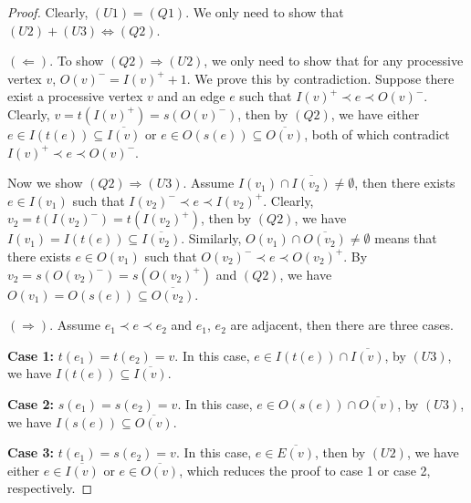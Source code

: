 \documentclass[10pt,a4paper]{amsart}
\begin{document}
\begin{proof}
Clearly, $(U1)=(Q1)$. We only need to show that $(U2)+(U3)\Longleftrightarrow (Q2)$.

$(\Longleftarrow)$. To show $(Q2)\Longrightarrow(U2)$, we only need to show that for any processive vertex $v$, $O(v)^-=I(v)^++1$. We prove this by contradiction. Suppose there exist a processive vertex $v$ and an edge $e$ such that $I(v)^+\prec e \prec O(v)^-$. Clearly, $v=t(I(v)^+)=s(O(v)^-)$, then by $(Q2)$, we have either $e\in I(t(e))\subseteq \overline{I(v)}$ or $e\in O(s(e))\subseteq\overline{O(v)}$, both of which  contradict $I(v)^+\prec e \prec O(v)^-$.

Now we show $(Q2)\Longrightarrow(U3)$. Assume $I(v_1)\cap \overline{I(v_2)}\neq \emptyset$, then there exists $e\in I(v_1)$ such that $I(v_2)^-\prec e \prec I(v_2)^+$. Clearly, $v_2=t(I(v_2)^-)=t(I(v_2)^+)$, then by $(Q2)$, we have $I(v_1)=I(t(e))\subseteq \overline{I(v_2)}$. Similarly, $O(v_1)\cap \overline{O(v_2)}\neq \emptyset$ means that there exists $e\in O(v_1)$ such that $O(v_2)^-\prec e \prec O(v_2)^+$. By $v_2=s(O(v_2)^-)=s(O(v_2)^+)$ and $(Q2)$, we have $O(v_1)=O(s(e))\subseteq \overline{O(v_2)}$.

$(\Longrightarrow)$. Assume $e_1\prec e\prec e_2$ and $e_1$, $e_2$ are adjacent, then there are three cases.

\noindent\textbf{Case 1:} $t(e_1)=t(e_2)=v$. In this case, $e\in I(t(e))\cap\overline{I(v)}$, by $(U3)$, we have $I(t(e))\subseteq\overline{I(v)}$.

\noindent\textbf{Case 2:} $s(e_1)=s(e_2)=v$. In this case, $e\in O(s(e))\cap\overline{O(v)}$, by $(U3)$, we have $I(s(e))\subseteq\overline{O(v)}$.

\noindent\textbf{Case 3:} $t(e_1)=s(e_2)=v$. In this case, $e\in \overline{E(v)}$, then by $(U2)$, we have either $e\in \overline{I(v)}$ or $e\in \overline{O(v)}$, which reduces the proof to case 1 or case 2, respectively.
\end{proof}
\end{document}
